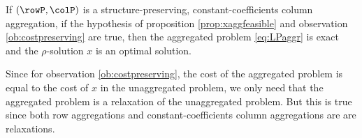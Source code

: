 \documentclass[smallextended,natbib]{svjour3}       %
\DeclareMathOperator{\supp}{supp}
\numberwithin{theorem}{section}
\begin{document}
\begin{proposition}
If \((\rowP,\colP)\) is a structure-preserving, constant-coefficients column aggregation,
if the hypothesis of proposition \ref{prop:xaggfeasible} and observation \ref{ob:costpreserving} are true, then the aggregated problem \eqref{eq:LPaggr} is exact and the \(\rho\)-solution \(x\) is an optimal solution.
\end{proposition}

   Since for observation \ref{ob:costpreserving}, the cost of the aggregated problem is equal to the cost of \(x\) in the unaggregated problem, we only need that the aggregated problem is a relaxation of the unaggregated problem.
   But this is true since both row aggregations and constant-coefficients column aggregations are are relaxations.
\end{document}

